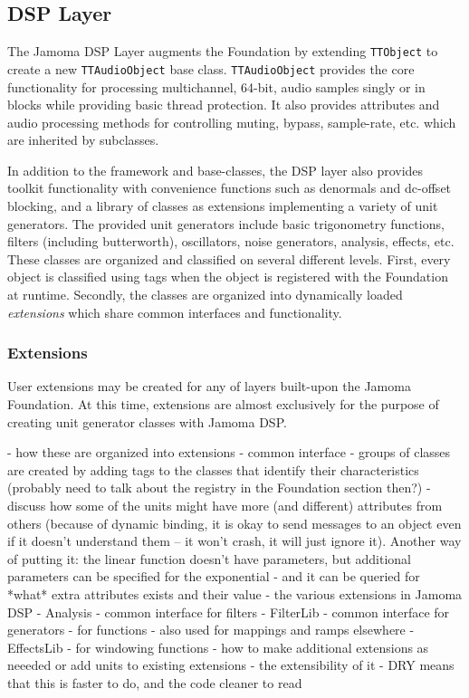 \documentclass[twoside,10pt]{article}
\begin{document}


\subsection{DSP Layer} %

The Jamoma DSP Layer \cite{web9} augments the Foundation by extending \texttt{TTObject} to create a new \texttt{TTAudioObject} base class.  \texttt{TTAudioObject} provides the core functionality for processing multichannel, 64-bit, audio samples singly or in blocks while providing basic thread protection.  It also provides attributes and audio processing methods for controlling muting, bypass, sample-rate, etc. which are inherited by subclasses.

In addition to the framework and base-classes, the DSP layer also provides toolkit functionality with convenience functions such as denormals and dc-offset blocking, and a library of classes as extensions implementing a variety of unit generators.  The provided unit generators include basic trigonometry functions, filters (including butterworth), oscillators, noise generators, analysis, effects, etc.  These classes are organized and classified on several different levels.  First, every object is classified using tags when the object is registered with the Foundation at runtime.  Secondly, the classes are organized into dynamically loaded \emph{extensions} which share common interfaces and functionality.

\subsubsection{Extensions}

User extensions may be created for any of layers built-upon the Jamoma Foundation.  At this time, extensions are almost exclusively for the purpose of creating unit generator classes with Jamoma DSP.


- how these are organized into extensions 
    - common interface
    - groups of classes are created by adding tags to the classes that identify their characteristics (probably need to talk about the registry in the Foundation section then?)
    - discuss how some of the units might have more (and different) attributes from others (because of dynamic binding, it is okay to send messages to an object even if it doesn't understand them -- it won't crash, it will just ignore it). Another way of putting it: the linear function doesn't have parameters, but additional parameters can be specified for the exponential - and it can be queried for *what* extra attributes exists and their value
- the various extensions in Jamoma DSP
    - Analysis
    - common interface for filters - FilterLib
    - common interface for generators
    - for functions - also used for mappings and ramps elsewhere
    - EffectsLib
    - for windowing functions
- how to make additional extensions as neeeded or add units to existing extensions
    - the extensibility of it 
    - DRY means that this is faster to do, and the code cleaner to read
\end{document}
